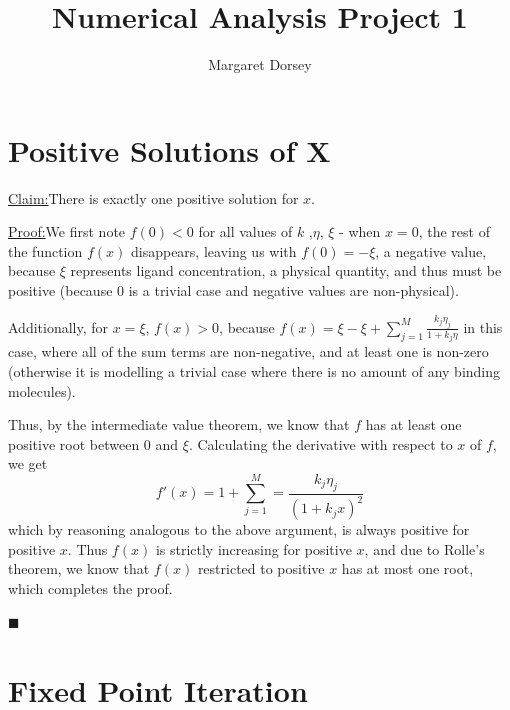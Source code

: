 \documentclass[11pt]{article} %
\title{Numerical Analysis Project 1}
\author{Margaret Dorsey}
\newenvironment{claim}[1]{\par\noindent\underline{Claim:}\space#1}{}
\newenvironment{proof}[1]{\par\noindent\underline{Proof:}\space#1}{\hfill $\blacksquare$}
\begin{document}
\maketitle

\section*{Positive Solutions of X}

\begin{claim}
There is exactly one positive solution for $x$.
\end{claim}
\begin{proof}

We first note $f(0) < 0$ for all values of $k$ ,$\eta$, $\xi$ - when $x = 0$, the rest of the function $f(x)$ disappears, leaving us with $f(0) = -\xi$, a negative value, because $\xi$ represents ligand concentration, a physical quantity, and thus must be positive (because $0$ is a trivial case and negative values are non-physical).
\par Additionally, for $x = \xi$, $f(x) > 0$, because $f(x) = \xi - \xi + \sum_{j=1}^{M} \frac{k_j \eta_j}{1+k_j\eta}$ in this case, where all of the sum terms are non-negative, and at least one is non-zero (otherwise it is modelling a trivial case where there is no amount of any binding molecules).
\par Thus, by the intermediate value theorem, we know that $f$ has at least one positive root between $0$ and $\xi$. Calculating the derivative with respect to $x$ of $f$, we get
	$$f'(x) = 1 + \sum_{j=1}^{M} = \frac{k_j \eta_j}{(1+k_jx)^2}$$
which by reasoning analogous to the above argument, is always positive for positive $x$. Thus $f(x)$ is strictly increasing for positive $x$, and due to Rolle's theorem, we know that $f(x)$ restricted to positive $x$ has at most one root, which completes the proof.

\end{proof}

\section*{Fixed Point Iteration}
\end{document}
